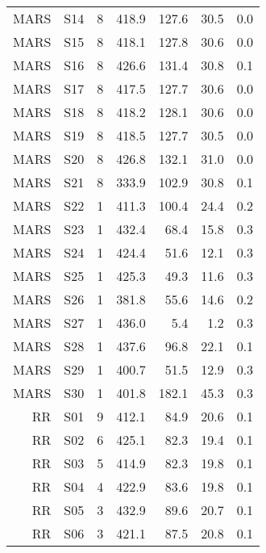 \begin{table}
\begin{tabular}{rrrrrrr}
 MARS &  S14 &             8 &   418.9 & 127.6 &         30.5 &    0.0 \\
 MARS &  S15 &             8 &   418.1 & 127.8 &         30.6 &    0.0 \\
 MARS &  S16 &             8 &   426.6 & 131.4 &         30.8 &    0.1 \\
 MARS &  S17 &             8 &   417.5 & 127.7 &         30.6 &    0.0 \\
 MARS &  S18 &             8 &   418.2 & 128.1 &         30.6 &    0.0 \\
 MARS &  S19 &             8 &   418.5 & 127.7 &         30.5 &    0.0 \\
 MARS &  S20 &             8 &   426.8 & 132.1 &         31.0 &    0.0 \\
 MARS &  S21 &             8 &   333.9 & 102.9 &         30.8 &    0.1 \\
 MARS &  S22 &             1 &   411.3 & 100.4 &         24.4 &    0.2 \\
 MARS &  S23 &             1 &   432.4 &  68.4 &         15.8 &    0.3 \\
 MARS &  S24 &             1 &   424.4 &  51.6 &         12.1 &    0.3 \\
 MARS &  S25 &             1 &   425.3 &  49.3 &         11.6 &    0.3 \\
 MARS &  S26 &             1 &   381.8 &  55.6 &         14.6 &    0.2 \\
 MARS &  S27 &             1 &   436.0 &   5.4 &          1.2 &    0.3 \\
 MARS &  S28 &             1 &   437.6 &  96.8 &         22.1 &    0.1 \\
 MARS &  S29 &             1 &   400.7 &  51.5 &         12.9 &    0.3 \\
 MARS &  S30 &             1 &   401.8 & 182.1 &         45.3 &    0.3 \\
   RR &  S01 &             9 &   412.1 &  84.9 &         20.6 &    0.1 \\
   RR &  S02 &             6 &   425.1 &  82.3 &         19.4 &    0.1 \\
   RR &  S03 &             5 &   414.9 &  82.3 &         19.8 &    0.1 \\
   RR &  S04 &             4 &   422.9 &  83.6 &         19.8 &    0.1 \\
   RR &  S05 &             3 &   432.9 &  89.6 &         20.7 &    0.1 \\
   RR &  S06 &             3 &   421.1 &  87.5 &         20.8 &    0.1 \\

\end{tabular}
\end{table}
